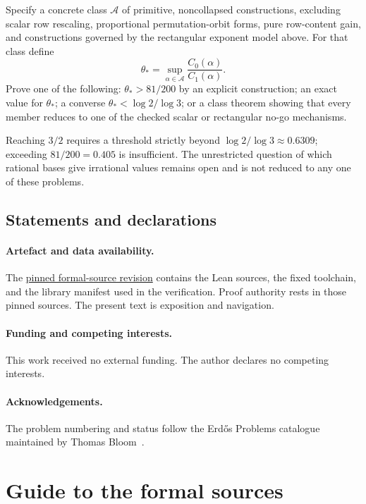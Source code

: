 \begin{problem}
Specify a concrete class $\mathcal A$ of primitive, noncollapsed constructions,
excluding scalar row rescaling, proportional permutation-orbit forms, pure
row-content gain, and constructions governed by the rectangular exponent model
above.  For that class define
\[
 \theta_*=\sup_{\alpha\in\mathcal A}
   \frac{C_0(\alpha)}{C_1(\alpha)}.
\]
Prove one of the following: $\theta_*>81/200$ by an explicit construction;
an exact value for $\theta_*$; a converse
$\theta_*<\log2/\log3$; or a class theorem showing that every member reduces to
one of the checked scalar or rectangular no-go mechanisms.
\end{problem}

Reaching $3/2$ requires a threshold strictly beyond
$\log2/\log3\approx0.6309$; exceeding $81/200=0.405$ is insufficient.
The unrestricted question of which rational bases give irrational values
remains open and is not reduced to any one of these problems.

\subsection*{Statements and declarations}

\paragraph{Artefact and data availability.} The
\href{\sourceurl}{pinned formal-source revision} contains the Lean sources, the
fixed toolchain, and the library manifest used in the verification.  Proof
authority rests in those pinned sources.  The present text is exposition and
navigation.

\paragraph{Funding and competing interests.} This work received no external
funding.  The author declares no competing interests.

\paragraph{Acknowledgements.} The problem numbering and status follow the
Erd\H{o}s Problems catalogue maintained by Thomas Bloom~\cite{erdosproblems}.

\appendix
\section{Guide to the formal sources}\label{long1049:app:index}

